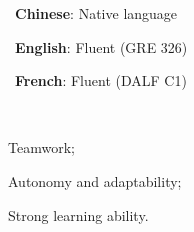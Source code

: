 \begin{textblock*}{\sideinnerw}
\begin{minipage}[t]{\sideinnerw}
\vspace{3mm}
{\centering\normalsize
\cvdotmark\ \textbf{Chinese}: Native language\par\vspace{0.6mm}
\par\vspace{1mm}
\cvdotmark\ \textbf{English}: Fluent (GRE 326)\par\vspace{0.6mm}
\par\vspace{1mm}
\cvdotmark\ \textbf{French}: Fluent (DALF C1)\par\vspace{0.6mm}
\par
}

\vspace{3mm}
{\centering\textcolor{cvblue}{\LARGE\faBookOpen\ \faBasketballBall\ \faFutbol}\ \cvflower\par}

\vspace{3mm}
{\normalsize\itshape
\begin{sideitemize}
\item Teamwork;
\item Autonomy and adaptability;
\item Strong learning ability.
\end{sideitemize}
}
\end{minipage}
\end{textblock*}


